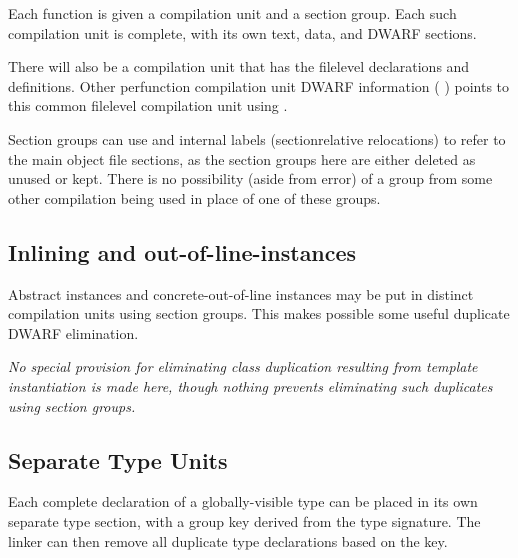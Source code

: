 Each function is given a compilation unit and a section
group. Each such compilation unit is complete, with its own
text, data, and DWARF sections.

There will also be a compilation unit that has the file\dash level
declarations and definitions. Other per\dash function compilation
unit DWARF information (
) points to this common
file\dash level compilation unit using .

Section groups can use  and internal labels
(section\dash relative relocations) to refer to the main object
file sections, as the 
section groups here are either deleted
as unused or kept. There is no possibility (aside from error)
of a group from some other compilation being used in place
of one of these groups.


\subsection{Inlining and out-of-line-instances}
\label{app:inliningandoutoflineinstances}

Abstract instances
and concrete-out-of-line instances may be
put in distinct compilation units using 
section groups. 
This
makes possible some useful duplicate DWARF elimination.

\textit{No special provision for eliminating class duplication
resulting from template instantiation is made here, though
nothing prevents eliminating such duplicates using section
groups.}


\subsection{Separate Type Units}
\label{app:separatetypeunits}

Each complete declaration of a globally-visible type can be
placed in its own separate type section, with a group key
derived from the type signature. The linker can then remove
all duplicate type declarations based on the key.

